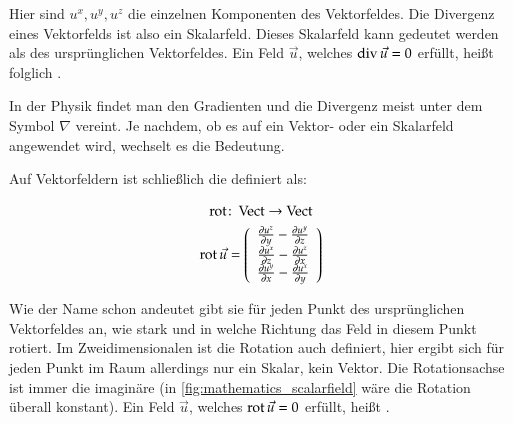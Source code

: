 Hier sind $u^x,u^y,u^z$ die einzelnen Komponenten des Vektorfeldes. Die
Divergenz eines Vektorfelds ist also ein Skalarfeld. Dieses Skalarfeld kann
gedeutet werden als  des ursprünglichen
Vektorfeldes. Ein Feld
$\vec{u}$, welches $\operatorname*{div} \vec{u}=0$ erfüllt, heißt folglich
.

In der Physik findet man den Gradienten und die Divergenz meist unter dem Symbol
$\nabla$ vereint. Je nachdem, ob es auf ein Vektor- oder ein Skalarfeld
angewendet wird, wechselt es die Bedeutung.

Auf Vektorfeldern ist schließlich die 
definiert als:

\begin{gather}
\operatorname*{rot} \colon \operatorname*{Vect} \to \operatorname*{Vect} \\
\operatorname*{rot} \vec{u}
=
\left(
	\begin{array}{c}
		\frac{\partial u^z}{\partial y} - \frac{\partial u^y}{\partial z} \\
		\frac{\partial u^x}{\partial z} - \frac{\partial u^z}{\partial x} \\
		\frac{\partial u^y}{\partial x} - \frac{\partial u^x}{\partial y}
	\end{array}
\right)
\end{gather}

Wie der Name schon andeutet gibt sie für jeden Punkt des
ursprünglichen Vektorfeldes an, wie stark und in welche Richtung das
Feld in diesem Punkt rotiert. Im Zweidimensionalen ist die Rotation
auch definiert, hier ergibt sich für jeden Punkt im Raum allerdings
nur ein Skalar, kein Vektor. Die Rotationsachse ist immer die
imaginäre  (in
\autoref{fig:mathematics_scalarfield} wäre die Rotation überall
konstant). Ein Feld $\vec{u}$, welches $\operatorname*{rot} \vec{u}=0$
erfüllt, heißt .

